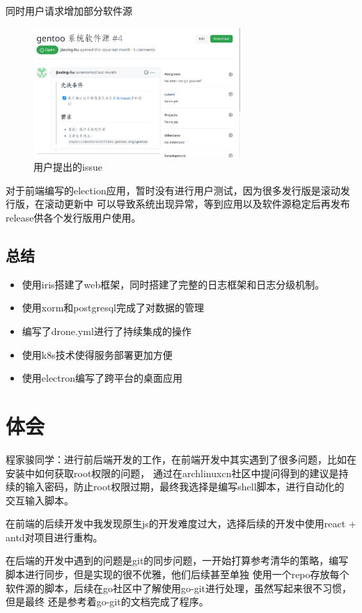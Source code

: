 \documentclass[supercite]{Experimental_Report}
\theoremstyle{definition}
\begin{document}
同时用户请求增加部分软件源
\begin{figure}[!h]
    \centering
    \includegraphics[width=0.7\textwidth]{./images/comment.png}
    \caption{用户提出的issue}
    \label{issue}
\end{figure}

对于前端编写的election应用，暂时没有进行用户测试，因为很多发行版是滚动发行版，在滚动更新中
可以导致系统出现异常，等到应用以及软件源稳定后再发布release供各个发行版用户使用。

\subsection{总结}
\begin{itemize}
    \item 使用iris搭建了web框架，同时搭建了完整的日志框架和日志分级机制。
    \item 使用xorm和postgresql完成了对数据的管理
    \item 编写了drone.yml进行了持续集成的操作
    \item 使用k8s技术使得服务部署更加方便
    \item 使用electron编写了跨平台的桌面应用
\end{itemize}

\section{体会}

程家骏同学：进行前后端开发的工作，在前端开发中其实遇到了很多问题，比如在安装中如何获取root权限的问题，
通过在archlinuxcn社区中提问得到的建议是持续的输入密码，防止root权限过期，最终我选择是编写shell脚本，进行自动化的
交互输入脚本。

在前端的后续开发中我发现原生js的开发难度过大，选择后续的开发中使用react + antd对项目进行重构。

在后端的开发中遇到的问题是git的同步问题，一开始打算参考清华的策略，编写脚本进行同步，但是实现的很不优雅，他们后续甚至单独
使用一个repo存放每个软件源的脚本，后续在go社区中了解使用go-git进行处理，虽然写起来很不习惯，但是最终
还是参考着go-git的文档完成了程序。
\end{document}
